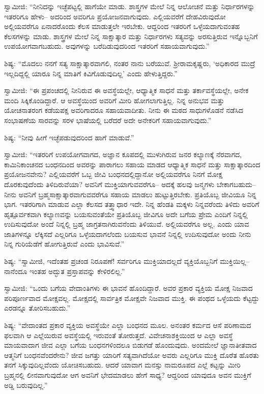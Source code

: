  ಸ್ವಾಮೀಜಿ: “ನೀನಿದನ್ನು ಇಚ್ಛೆಪಟ್ಟಲ್ಲಿ ಹಾಗೆಯೇ ಮಾಡು. ಶಾಸ್ತ್ರಗಳ ಮೇಲೆ ನಿನ್ನ ಆಲೋಚನೆ ಮತ್ತು ನಿರ್ಧಾರಗಳನ್ನು ಇತರರಿಗೂ ಹೇಳು– ಅದರಿಂದ ಅವರಿಗೂ ಪ್ರಯೋಜನವಾಗುವುದು. ಎಲ್ಲಿಯವರೆಗೆ ದೇಹವಿರುವುದೋ ಅಲ್ಲಿಯವರೆಗೂ ಏನಾದರೊಂದು ಕೆಲಸ ಮಾಡುತ್ತಲೇ ಇರಬೇಕು. ಆದ್ದರಿಂದ ಇತರರಿಗೆ ಒಳ್ಳೆಯದಾಗುವಂತಹ ಕೆಲಸಗಳನ್ನು ಮಾಡು. ಶಾಸ್ತ್ರಗಳ ಮೇಲೆ ನಿನ್ನ ಸಾಕ್ಷಾತ್ಕಾರ ಮತ್ತು ನಿರ್ಧಾರಗಳು ಸತ್ಯವನ್ನು ಅರಸುತ್ತಿರುವ ಇನ್ನೊಬ್ಬನಿಗೆ ಉಪಯೋಗವಾಗಬಹುದು. ಅವುಗಳನ್ನು ಬರೆದಿಡುವುದರಿಂದ ಇತರರಿಗೆ ಸಹಾಯವಾಗುವುದು.” 

 ಶಿಷ್ಯ: “ಮೊದಲು ನನಗೆ ಸತ್ಯ ಸಾಕ್ಷಾತ್ಕಾರವಾಗಲಿ, ನಂತರ ನಾನು ಬರೆಯುವೆ. ಶ‍್ರೀರಾಮಕೃಷ್ಣರು, ‘ಅಧಿಕಾರದ ಮುದ್ರೆ ಇಲ್ಲದಿದ್ದಲ್ಲಿ ಯಾರೂ ನಿನ್ನ ಮಾತಿಗೆ ಕಿವಿಗೊಡುವುದಿಲ್ಲ’ ಎಂದು ಹೇಳುತ್ತಿದ್ದರು.” 

 ಸ್ವಾಮೀಜಿ: “ಈ ಪ್ರಪಂಚದಲ್ಲಿ ನೀನಿರುವ ಈ ಅವಸ್ಥೆಯಲ್ಲೇ, ಆಧ್ಯಾತ್ಮಿಕ ಸಾಧನೆ ಮತ್ತು ತರ್ಕಾವಸ್ಥೆಯಲ್ಲೇ, ಅನೇಕ ಮಂದಿ ಸಿಕ್ಕಿಕೊಂಡಿದ್ದಾರೆ. ಆ ಅವಸ್ಥೆಯಿಂದ ಅವರಿಗೆ ಮೀರಿ ಹೋಗಲಾಗುತ್ತಿಲ್ಲ. ನಿನ್ನ ಅನುಭವ ಮತ್ತು ಯೋಚನಾತರಂಗ ಕಡೆಯಪಕ್ಷ ಅವರಿಗಾದರೂ ಸಹಾಯವಾದೀತು. ನೀನು ಈ ಮಠದ ಸಾಧುಗಳೊಡನೆ ನಡೆಸಿದ ಸಂಭಾಷಣೆಯ ಸಾರವನ್ನು ಸರಳ ಭಾಷೆಯಲ್ಲಿ ಬರೆದರೆ ಅದೇ ಅನೇಕರಿಗೆ ಸಹಾಯವಾಗುವುದು.” 

 ಶಿಷ್ಯ: “ನೀವು ಹೀಗೆ ಇಚ್ಛೆಪಡುವುದರಿಂದ ಹಾಗೆ ಮಾಡುವೆ.” 

 ಸ್ವಾಮೀಜಿ: “ಇತರರಿಗೆ ಉಪಯೋಗವಾಗದ, ಅಜ್ಞಾನ ಕೂಪದಲ್ಲಿ ಮುಳುಗಿರುವ ಜನರ ಕಲ್ಯಾಣಕ್ಕೆ ನೆರವಾಗದ, ಕಾಮಿನಿಕಾಂಚನದ ಬಂಧನದಿಂದ ಅವರನ್ನು ಪಾರಾಗಲು ಸಹಾಯ ಮಾಡದ ಆಧ್ಯಾತ್ಮಿಕ ಸಾಧನೆ ಮತ್ತು ಸಾಕ್ಷಾತ್ಕಾರದಿಂದ ಪ್ರಯೋಜನವೇನು? ಎಲ್ಲಿಯವರೆಗೆ ಒಬ್ಬ ಜೀವಿ ಬಂಧನದಲ್ಲಿದ್ದಾನೋ ಅಲ್ಲಿಯವರೆಗೂ ನಿನಗೆ ಮೋಕ್ಷ ದೊರಕುವುದೆಂದು ತಿಳಿದಿರುವೆಯಾ? ಅವನಿಗೆ ಮುಕ್ತಿಯಾಗುವವರೆಗೂ– ಅದಕ್ಕೆ ಹಲವು ಜನ್ಮಗಳು ಬೇಕಾಗಬಹುದು– ನೀನು ಅವನಿಗೆ ಬ್ರಹ್ಮಸಾಕ್ಷಾತ್ಕಾರವಾಗುವವರೆಗೂ ಸಹಾಯ ಮಾಡಲು ಹುಟ್ಟುತ್ತಿರಬೇಕು. ಪ್ರತಿಯೊಬ್ಬ ಜೀವಿಯೂ ನಿನ್ನ ಭಾಗ. ಇತರರಿಗಾಗಿ ಮಾಡುವ ಎಲ್ಲಾ ಕೆಲಸದ ತತ್ತ್ವಾಧಾರ ಇದೇ. ನಿನ್ನ ಹೆಂಡತಿ ಮಕ್ಕಳು ನಿನ್ನವರೆಂದು ತಿಳಿದು ಅವರಿಗೆ ಹೃತ್ಪೂರ್ವಕವಾಗಿ ಕಲ್ಯಾಣವನ್ನು ಬಯಸುವಂತೆಯೇ ಪ್ರತಿಯೊಬ್ಬ ಜೀವಿಗೂ ಅದೇ ಬಗೆಯ ಪ್ರೇಮ ಎಂದಿಗೆ ನಿನ್ನಲ್ಲಿ ಉದಿಸುವುದೋ ಅಂದೆ ನಿನ್ನಲ್ಲಿ ಬ್ರಹ್ಮ ಜಾಗ್ರತನಾಗಿರುವನೆಂದು ತಿಳಿಯುವೆ. ಅಲ್ಲಿಯವರೆಗೂ ಅಲ್ಲ. ಎಂದು ಯಾವ ಜಾತಿಗಳನ್ನೂ ಲೆಕ್ಕಿಸದೆ ಎಲ್ಲರಿಗೂ ಒಳ್ಳೆಯದಾಗಲೆಂದು ಬಯಸುವ ಭಾವನೆ ನಿನ್ನಲ್ಲಿ ಉದಿಸುವುದೋ ಅಂದು ನೀನು ನಿನ್ನ ಗುರಿಯೆಡೆಗೆ ಹೋಗುತ್ತಿರುವೆ ಎಂದು ಭಾವಿಸುವೆ.” 

 ಶಿಷ್ಯ: “ಸ್ವಾಮೀಜಿ, ಇದೆಂತಹ ಪ್ರಚಂಡ ನಿರೂಪಣೆ! ಸರ್ವರಿಗೂ ಮುಕ್ತಿಯಾದಲ್ಲದೆ ವ್ಯಕ್ತಿಯೊಬ್ಬನಿಗೆ ಮುಕ್ತಿಯಿಲ್ಲ– ನಾನೆಂದೂ ಇಂತಹ ಅದ್ಭುತ ಪ್ರಸ್ತಾಪವನ್ನು ಕೇಳಿರಲಿಲ್ಲ.” 

 ಸ್ವಾಮೀಜಿ: “ಒಂದು ಬಗೆಯ ವೇದಾಂತಿಗಳು ಈ ಭಾವನೆ ಹೊಂದಿದ್ದಾರೆ. ಅವರ ಪ್ರಕಾರ ವ್ಯಕ್ತಿಯ ಮೋಕ್ಷ ನಿಜವಾದ ಪರಿಪೂರ್ಣವಾದ ಮೋಕ್ಷವಲ್ಲ. ಮೋಕ್ಷದಲ್ಲಿ ಸಾರ್ವತ್ರಿಕ ಮೋಕ್ಷವೇ ನಿಜವಾದ ಮುಕ್ತಿ. ಈ ಪಂಥದ ಒಳ್ಳೆಯದು ಕೆಟ್ಟದ್ದು ಎರಡನ್ನೂ ತೋರಿಸಬಹುದು.” 

 ಶಿಷ್ಯ: “ವೇದಾಂತದ ಪ್ರಕಾರ ವ್ಯಕ್ತಿಯ ಅವಸ್ಥೆಯೇ ಎಲ್ಲಾ ಬಂಧನದ ಮೂಲ. ಅನಂತರ ಕರ್ಮದ ಆಸೆ ಪರಿಣಾಮದ ಫಲವಾಗಿ ಆ ಎಲ್ಲೆಯಿರುವ ಅವಸ್ಥೆಯಲ್ಲಿ ಇರುವಂತೆ ತೋರುತ್ತದೆ. ವಿವೇಚನಾಶಕ್ತಿಯಿಂದ ಆ ಎಲ್ಲಾ ಅವಸ್ಥೆ ಮಾಯವಾದಾಗ ಜೀವ ಎಲ್ಲಾ ಬಗೆಯ ಬಂಧನಗಳಿಂದಲೂ ಬಿಡುಗಡೆ ಹೊಂದುವುದು. ಅಂದಮೇಲೆ ಜ್ಞಾನಾತೀತವಾದ ಆತ್ಮನಿಗೆ ಬಂಧನವೆಂದರೇನು? ಜೀವ ಜಗತ್ತು ಯಾರಿಗೆ ಸತ್ಯವಾಗಿದೆಯೋ ಅವರು ಎಲ್ಲರಿಗೂ ಮುಕ್ತಿ ದೊರೆತ ಹೊರತು ತನಗೆ ಸಿಕ್ಕುವುದಿಲ್ಲವೆಂದು ಯೋಚಿಸಬಹುದು. ಆದರೆ ಯಾವಾಗ ಮನಸ್ಸು ನಾಮರೂಪದ ಎಲ್ಲೆ ಕಟ್ಟನ್ನು ಮೀರಿ ಬ್ರಹ್ಮನಲ್ಲಿ ಲೀನವಾಗುವುದೋ ಆಗ ಅವನಿಗೆ ಭೇದಮಾಡಲು ಹೇಗೆ ಸಾಧ್ಯ? ಆದ್ದರಿಂದ ಯಾವುದೂ ಅವನ ಮುಕ್ತಿಗೆ ಅಡ್ಡಿ ಬರುವುದಿಲ್ಲ.” 

